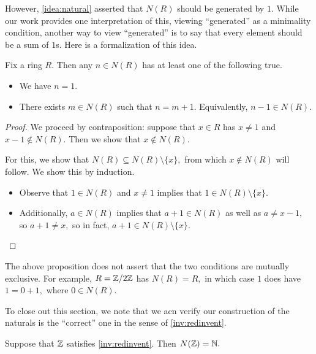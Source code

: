 \documentclass{article}
\begin{document}
However, \autoref{idea:natural} asserted that $N(R)$ should be generated by $1.$ While our work provides one interpretation of this, viewing ``generated'' as a minimality condition, another way to view ``generated'' is to say that every element should be a sum of $1$s. Here is a formalization of this idea.
\begin{proposition} \label{prop:natind}
	Fix a ring $R.$ Then any $n\in N(R)$ has at least one of the following true.
	\begin{itemize}
		\item We have $n=1.$
		\item There exists $m\in N(R)$ such that $n=m+1.$ Equivalently, $n-1\in N(R).$
	\end{itemize}
\end{proposition}
\begin{proof}
	We proceed by contraposition: suppose that $x\in R$ has $x\ne1$ and $x-1\notin N(R).$ Then we show that $x\notin N(R).$

	For this, we show that $N(R)\subseteq N(R)\setminus\{x\},$ from which $x\notin N(R)$ will follow. We show this by induction.
	\begin{itemize}
		\item Observe that $1\in N(R)$ and $x\ne1$ implies that $1\in N(R)\setminus\{x\}.$
		\item Additionally, $a\in N(R)$ implies that $a+1\in N(R)$ as well as $a\ne x-1,$ so $a+1\ne x,$ so in fact, $a+1\in N(R)\setminus\{x\}.$
		\qedhere
	\end{itemize}
\end{proof}
\begin{remark}
	The above proposition does not assert that the two conditions are mutually exclusive. For example, $R=\mathbb Z/2\mathbb Z$ has $N(R)=R,$ in which case $1$ does have $1=0+1,$ where $0\in N(R).$
\end{remark}
To close out this section, we note that we acn verify our construction of the naturals is the ``correct'' one in the sense of \autoref{inv:redinvent}.
\begin{proposition} \label{prop:natcorrect}
	Suppose that $\mathbb Z$ satisfies \autoref{inv:redinvent}. Then $N(\mathbb Z)=\mathbb N.$
\end{proposition}
\end{document}
